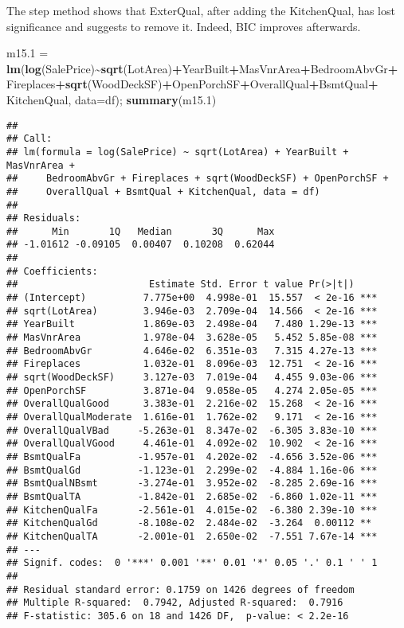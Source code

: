 \documentclass[
]{article}
\newenvironment{Shaded}{\begin{snugshade}}{\end{snugshade}}
\newcommand{\AttributeTok}[1]{\textcolor[rgb]{0.13,0.29,0.53}{#1}}
\newcommand{\FloatTok}[1]{\textcolor[rgb]{0.00,0.00,0.81}{#1}}
\newcommand{\FunctionTok}[1]{\textcolor[rgb]{0.13,0.29,0.53}{\textbf{#1}}}
\newcommand{\NormalTok}[1]{#1}
\newcommand{\OtherTok}[1]{\textcolor[rgb]{0.56,0.35,0.01}{#1}}
\newcommand{\SpecialCharTok}[1]{\textcolor[rgb]{0.81,0.36,0.00}{\textbf{#1}}}
\begin{document}
The step method shows that ExterQual, after adding the KitchenQual, has
lost significance and suggests to remove it. Indeed, BIC improves
afterwards.

\begin{Shaded}
\begin{Highlighting}[]
\NormalTok{m15}\FloatTok{.1} \OtherTok{=} \FunctionTok{lm}\NormalTok{(}\FunctionTok{log}\NormalTok{(SalePrice)}\SpecialCharTok{\textasciitilde{}}\FunctionTok{sqrt}\NormalTok{(LotArea)}\SpecialCharTok{+}\NormalTok{YearBuilt}\SpecialCharTok{+}\NormalTok{MasVnrArea}\SpecialCharTok{+}\NormalTok{BedroomAbvGr}\SpecialCharTok{+}
\NormalTok{             Fireplaces}\SpecialCharTok{+}\FunctionTok{sqrt}\NormalTok{(WoodDeckSF)}\SpecialCharTok{+}\NormalTok{OpenPorchSF}\SpecialCharTok{+}\NormalTok{OverallQual}\SpecialCharTok{+}\NormalTok{BsmtQual}\SpecialCharTok{+}
\NormalTok{             KitchenQual, }\AttributeTok{data=}\NormalTok{df); }\FunctionTok{summary}\NormalTok{(m15}\FloatTok{.1}\NormalTok{)}
\end{Highlighting}
\end{Shaded}

\begin{verbatim}
## 
## Call:
## lm(formula = log(SalePrice) ~ sqrt(LotArea) + YearBuilt + MasVnrArea + 
##     BedroomAbvGr + Fireplaces + sqrt(WoodDeckSF) + OpenPorchSF + 
##     OverallQual + BsmtQual + KitchenQual, data = df)
## 
## Residuals:
##      Min       1Q   Median       3Q      Max 
## -1.01612 -0.09105  0.00407  0.10208  0.62044 
## 
## Coefficients:
##                       Estimate Std. Error t value Pr(>|t|)    
## (Intercept)          7.775e+00  4.998e-01  15.557  < 2e-16 ***
## sqrt(LotArea)        3.946e-03  2.709e-04  14.566  < 2e-16 ***
## YearBuilt            1.869e-03  2.498e-04   7.480 1.29e-13 ***
## MasVnrArea           1.978e-04  3.628e-05   5.452 5.85e-08 ***
## BedroomAbvGr         4.646e-02  6.351e-03   7.315 4.27e-13 ***
## Fireplaces           1.032e-01  8.096e-03  12.751  < 2e-16 ***
## sqrt(WoodDeckSF)     3.127e-03  7.019e-04   4.455 9.03e-06 ***
## OpenPorchSF          3.871e-04  9.058e-05   4.274 2.05e-05 ***
## OverallQualGood      3.383e-01  2.216e-02  15.268  < 2e-16 ***
## OverallQualModerate  1.616e-01  1.762e-02   9.171  < 2e-16 ***
## OverallQualVBad     -5.263e-01  8.347e-02  -6.305 3.83e-10 ***
## OverallQualVGood     4.461e-01  4.092e-02  10.902  < 2e-16 ***
## BsmtQualFa          -1.957e-01  4.202e-02  -4.656 3.52e-06 ***
## BsmtQualGd          -1.123e-01  2.299e-02  -4.884 1.16e-06 ***
## BsmtQualNBsmt       -3.274e-01  3.952e-02  -8.285 2.69e-16 ***
## BsmtQualTA          -1.842e-01  2.685e-02  -6.860 1.02e-11 ***
## KitchenQualFa       -2.561e-01  4.015e-02  -6.380 2.39e-10 ***
## KitchenQualGd       -8.108e-02  2.484e-02  -3.264  0.00112 ** 
## KitchenQualTA       -2.001e-01  2.650e-02  -7.551 7.67e-14 ***
## ---
## Signif. codes:  0 '***' 0.001 '**' 0.01 '*' 0.05 '.' 0.1 ' ' 1
## 
## Residual standard error: 0.1759 on 1426 degrees of freedom
## Multiple R-squared:  0.7942, Adjusted R-squared:  0.7916 
## F-statistic: 305.6 on 18 and 1426 DF,  p-value: < 2.2e-16
\end{verbatim}
\end{document}

